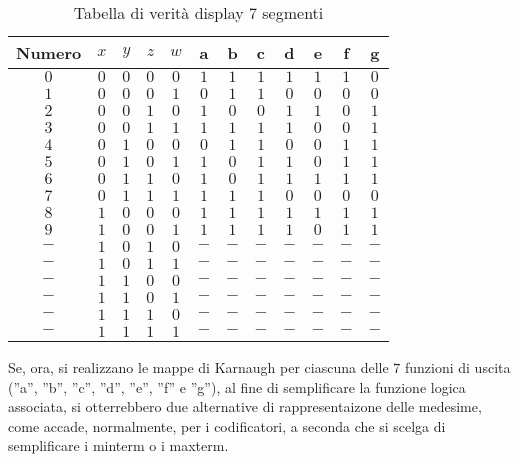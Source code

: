 \documentclass[a4paper]{extarticle}
\newcommand{\quotes}[1]{''#1''}
\renewcommand\arraystretch{}
\begin{document}
\begin{table}[H]
    \centering
    \setlength{\tabcolsep}{8pt}
    \renewcommand{\arraystretch}{1.1}
    \begin{tabular}{c|cccc|ccccccc}
         Numero & $x$ & $y$ & $z$ & $w$ & a & b & c & d & e & f & g\\
         \hline
         $0$ & $0$ & $0$ & $0$ & $0$ & $1$ & $1$ & $1$ & $1$ & $1$ & $1$ & $0$\\
         $1$ & $0$ & $0$ & $0$ & $1$ & $0$ & $1$ & $1$ & $0$ & $0$ & $0$ & $0$ \\
         $2$ & $0$ & $0$ & $1$ & $0$ & $1$ & $0$ & $0$ & $1$ & $1$ & $0$ & $1$ \\
         $3$ & $0$ & $0$ & $1$ & $1$ & $1$ & $1$ & $1$ & $1$ & $0$ & $0$ & $1$ \\
         \hline
         $4$ & $0$ & $1$ & $0$ & $0$ & $0$ & $1$ & $1$ & $0$ & $0$ & $1$ & $1$ \\
         $5$ & $0$ & $1$ & $0$ & $1$ & $1$ & $0$ & $1$ & $1$ & $0$ & $1$ & $1$ \\
         $6$ & $0$ & $1$ & $1$ & $0$ & $1$ & $0$ & $1$ & $1$ & $1$ & $1$ & $1$ \\
         $7$ & $0$ & $1$ & $1$ & $1$ & $1$ & $1$ & $1$ & $0$ & $0$ & $0$ & $0$ \\
         \hline
         $8$ & $1$ & $0$ & $0$ & $0$ & $1$ & $1$ & $1$ & $1$ & $1$ & $1$ & $1$\\
         $9$ & $1$ & $0$ & $0$ & $1$ & $1$ & $1$ & $1$ & $1$ & $0$ & $1$ & $1$\\
         $-$ & $1$ & $0$ & $1$ & $0$ & $-$ & $-$ & $-$ & $-$ & $-$ & $-$ & $-$ \\
         $-$ & $1$ & $0$ & $1$ & $1$ & $-$ & $-$ & $-$ & $-$ & $-$ & $-$ & $-$ \\
         \hline
         $-$ & $1$ & $1$ & $0$ & $0$ & $-$ & $-$ & $-$ & $-$ & $-$ & $-$ & $-$ \\
         $-$ & $1$ & $1$ & $0$ & $1$ & $-$ & $-$ & $-$ & $-$ & $-$ & $-$ & $-$ \\
         $-$ & $1$ & $1$ & $1$ & $0$ & $-$ & $-$ & $-$ & $-$ & $-$ & $-$ & $-$ \\
         $-$ & $1$ & $1$ & $1$ & $1$ & $-$ & $-$ & $-$ & $-$ & $-$ & $-$ & $-$ \\
    \end{tabular}
    \caption{Tabella di verità display \(7\) segmenti}
    \label{tab:tabella_verita_display_7_segmenti}
\end{table}

\noindent
Se, ora, si realizzano le mappe di Karnaugh per ciascuna delle \(7\) funzioni di uscita (\quotes{a}, \quotes{b}, \quotes{c}, \quotes{d}, \quotes{e}, \quotes{f} e \quotes{g}), al fine di semplificare la funzione logica associata, si otterrebbero due alternative di rappresentaizone delle medesime, come accade, normalmente, per i codificatori, a seconda che si scelga di semplificare i minterm o i maxterm.
\end{document}
